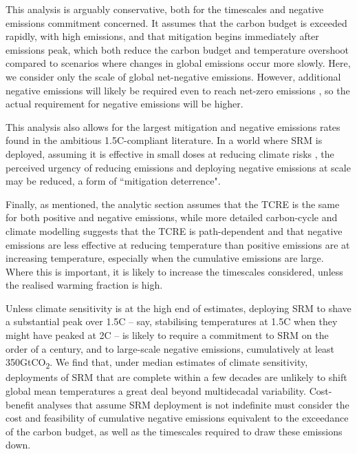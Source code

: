 \documentclass[draft]{agujournal2019}
\begin{document}
\medskip

This analysis is arguably conservative, both for the timescales and negative emissions commitment concerned. It assumes that the carbon budget is exceeded rapidly, with high emissions, and that mitigation begins immediately after emissions peak, which both reduce the carbon budget and temperature overshoot compared to scenarios where changes in global emissions occur more slowly.  Here, we consider only the scale of global net-negative emissions. However, additional negative emissions will likely be required even to reach net-zero emissions \cite{Anderson182}, so the actual requirement for negative emissions will be higher. 

\medskip

This analysis also allows for the largest mitigation and negative emissions rates found in the ambitious 1.5C-compliant literature. In a world where SRM is deployed, assuming it is effective in small doses at reducing climate risks \cite{irvine2019halving}, the perceived urgency of reducing emissions and deploying negative emissions at scale may be reduced, a form of ``mitigation deterrence".

\medskip 

Finally, as mentioned, the analytic section assumes that the TCRE is the same for both positive and negative emissions, while more detailed carbon-cycle and climate modelling suggests that the TCRE is path-dependent and that negative emissions are less effective at reducing temperature than positive emissions are at increasing temperature, especially when the cumulative emissions are large. Where this is important, it is likely to increase the timescales considered, unless the realised warming fraction is high. 

\medskip

Unless climate sensitivity is at the high end of estimates, deploying SRM to shave a substantial peak over 1.5C – say, stabilising temperatures at 1.5C when they might have peaked at 2C – is likely to require a commitment to SRM on the order of a century, and to large-scale negative emissions, cumulatively at least 350GtCO\textsubscript{2}. We find that, under median estimates of climate sensitivity, deployments of SRM that are complete within a few decades are unlikely to shift global mean temperatures a great deal beyond multidecadal variability. Cost-benefit analyses that assume SRM deployment is not indefinite must consider the cost and feasibility of cumulative negative emissions equivalent to the exceedance of the carbon budget, as well as the timescales required to draw these emissions down.
\end{document}
